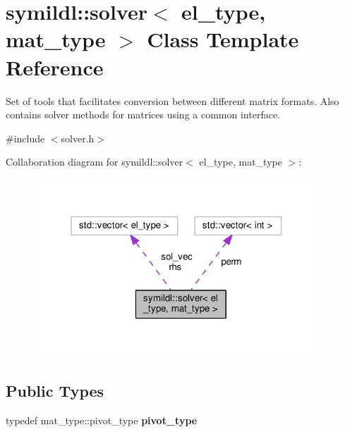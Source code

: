 \hypertarget{classsymildl_1_1solver}{}\section{symildl\+:\+:solver$<$ el\+\_\+type, mat\+\_\+type $>$ Class Template Reference}
\label{classsymildl_1_1solver}


Set of tools that facilitates conversion between different matrix formats. Also contains solver methods for matrices using a common interface.  




{\ttfamily \#include $<$solver.\+h$>$}



Collaboration diagram for symildl\+:\+:solver$<$ el\+\_\+type, mat\+\_\+type $>$\+:
\nopagebreak
\begin{figure}[H]
\begin{center}
\leavevmode
\includegraphics[width=304pt]{classsymildl_1_1solver__coll__graph}
\end{center}
\end{figure}
\subsection*{Public Types}
\begin{DoxyCompactItemize}
\item 
typedef mat\+\_\+type\+::pivot\+\_\+type {\bfseries pivot\+\_\+type}\hypertarget{classsymildl_1_1solver_a70b6b2c8dd2ad3c158f9a94047c7b45e}{}\label{classsymildl_1_1solver_a70b6b2c8dd2ad3c158f9a94047c7b45e}

\end{DoxyCompactItemize}

